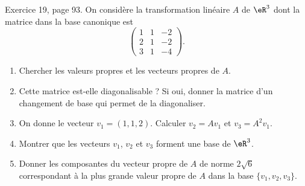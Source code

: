 \begin{exercice}\label{exoLineraire0042}

	Exercice 19, page 93. On considère la transformation linéaire $A$ de $\eR^3$ dont la matrice dans la base canonique est
	\begin{equation}
		\begin{pmatrix}
			1	&	1	&	-2\\ 
			2	&	1	&	-2\\ 
			3	&	1	&	-4	  
		\end{pmatrix}.
	\end{equation}
	\begin{enumerate}

		\item
			Chercher les valeurs propres et les vecteurs propres de $A$.
		\item
			Cette matrice est-elle diagonalisable ? Si oui, donner la matrice d'un changement de base qui permet de la diagonaliser.
		\item
			On donne le vecteur $v_1=(1,1,2)$. Calculer $v_2=Av_1$ et $v_3=A^2v_1$.
		\item
			Montrer que les vecteurs $v_1$, $v_2$ et $v_3$ forment une base  de $\eR^3$.
		\item
			Donner les composantes du vecteur propre de $A$ de norme $2\sqrt{6}$ correspondant à la plus grande valeur propre de $A$ dans la base $\{ v_1,v_2,v_3 \}$.
	\end{enumerate}
	
\end{exercice}
